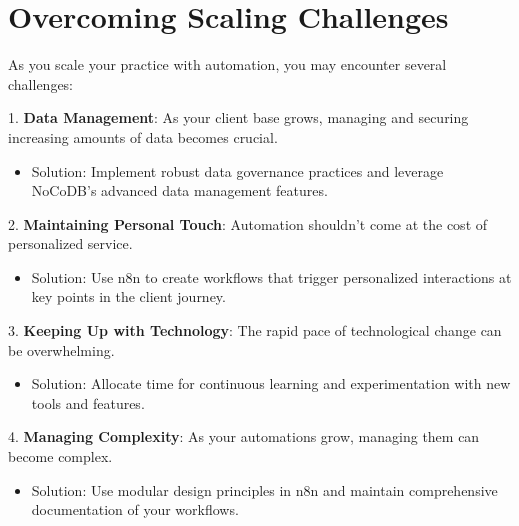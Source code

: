 \section{Overcoming Scaling Challenges}

As you scale your practice with automation, you may encounter several challenges:

1. \textbf{Data Management}: As your client base grows, managing and securing increasing amounts of data becomes crucial.
\begin{itemize}
    \item Solution: Implement robust data governance practices and leverage NoCoDB's advanced data management features.
\end{itemize}

2. \textbf{Maintaining Personal Touch}: Automation shouldn't come at the cost of personalized service.
\begin{itemize}
    \item Solution: Use n8n to create workflows that trigger personalized interactions at key points in the client journey.
\end{itemize}

3. \textbf{Keeping Up with Technology}: The rapid pace of technological change can be overwhelming.
\begin{itemize}
    \item Solution: Allocate time for continuous learning and experimentation with new tools and features.
\end{itemize}

4. \textbf{Managing Complexity}: As your automations grow, managing them can become complex.
\begin{itemize}
    \item Solution: Use modular design principles in n8n and maintain comprehensive documentation of your workflows.
\end{itemize}

